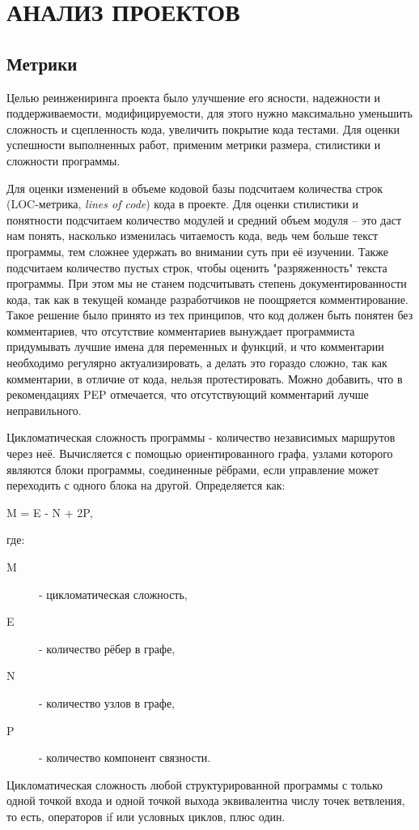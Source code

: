 \section{АНАЛИЗ ПРОЕКТОВ}
    \subsection{Метрики}
    Целью реинжениринга проекта было улучшение его ясности, надежности и поддерживаемости,
    модифицируемости, для этого нужно максимально уменьшить сложность и сцепленность кода,
    увеличить покрытие кода тестами.
    Для оценки успешности выполненных работ, применим метрики размера,
    стилистики и сложности программы.
    \cite{metrics.cmcons}\cite{clearcode.habr}

    Для оценки изменений в объеме кодовой базы подсчитаем количества строк
    (LOC-метрика, \textit{lines of code}) кода в проекте.
    Для оценки стилистики и понятности подсчитаем количество модулей и средний
    объем модуля -- это даст нам понять, насколько изменилась читаемость кода,
    ведь чем больше текст программы, тем сложнее удержать во внимании суть при 
    её изучении. Также подсчитаем количество пустых строк, чтобы оценить
    "разряженность" текста программы.
    При этом мы не станем подсчитывать степень документированности кода,
    так как в текущей команде разработчиков не поощряется комментирование.
    Такое решение было принято из тех принципов,
    что код должен быть понятен без комментариев,
    что отсутствие комментариев вынуждает программиста придумывать лучшие имена
    для переменных и функций,
    и что комментарии необходимо регулярно актуализировать, а делать это
    гораздо сложно, так как комментарии, в отличие от кода,  нельзя
    протестировать.
    Можно добавить, что в рекомендациях PEP отмечается, что отсутствующий
    комментарий лучше неправильного.

    Цикломатическая сложность программы - количество независимых маршрутов через
    неё. Вычисляется с помощью ориентированного графа, узлами которого являются
    блоки программы, соединенные рёбрами, если управление может переходить с
    одного блока на другой. Определяется как:
    \begin{center}
        M = E - N + 2P,
    \end{center}
    где:
    \begin{description}
        \item [M] - цикломатическая сложность,
        \item [E] - количество рёбер в графе,
        \item [N] - количество узлов в графе,
        \item [P] - количество компонент связности.
    \end{description}
    Цикломатическая сложность любой структурированной программы с только одной
    точкой входа и одной точкой выхода эквивалентна числу точек ветвления,
    то есть, операторов if или условных циклов, плюс один.
    \cite{complexity.McCabe}


